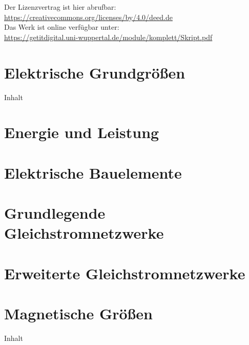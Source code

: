 \documentclass[twoside, a4paper]{article}
\begin{document}
Der Lizenzvertrag ist hier abrufbar:\\
\url{https://creativecommons.org/licenses/by/4.0/deed.de}\\
Das Werk ist online verfügbar unter:\\
\url{https://getitdigital.uni-wuppertal.de/module/komplett/Skript.pdf}
\newpage

{\setlength{\parskip}{0.05ex}    %
	\tableofcontents
	\newpage
}

\printnomenclature
\cleardoublepage

\pagestyle{fancyplain}
\fancyfoot[EL,OR]{}

\cleardoublepage
\part{Elektrische Grundgrößen}
{Inhalt}

\cleardoublepage
\part{Energie und Leistung}

\cleardoublepage
\part{Elektrische Bauelemente}

\cleardoublepage
\part{Grundlegende Gleichstromnetzwerke}

\cleardoublepage
\part{Erweiterte Gleichstromnetzwerke}

\cleardoublepage
\part{Magnetische Größen}
{Inhalt}
\end{document}
